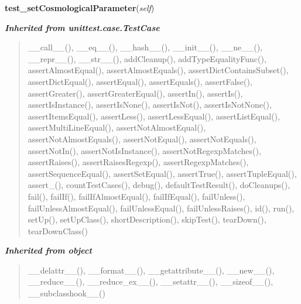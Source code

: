     \label{pycosmicstar:test_cosmology:test_lcdmcosmology:test_setCosmologicalParameter}

    \vspace{0.5ex}

\hspace{.8\funcindent}\begin{boxedminipage}{\funcwidth}

    \raggedright \textbf{test\_setCosmologicalParameter}(\textit{self})

\setlength{\parskip}{2ex}
\setlength{\parskip}{1ex}
    \end{boxedminipage}


\large{\textbf{\textit{Inherited from unittest.case.TestCase}}}

\begin{quote}
\_\_call\_\_(), \_\_eq\_\_(), \_\_hash\_\_(), \_\_init\_\_(), \_\_ne\_\_(), \_\_repr\_\_(), \_\_str\_\_(), addCleanup(), addTypeEqualityFunc(), assertAlmostEqual(), assertAlmostEquals(), assertDictContainsSubset(), assertDictEqual(), assertEqual(), assertEquals(), assertFalse(), assertGreater(), assertGreaterEqual(), assertIn(), assertIs(), assertIsInstance(), assertIsNone(), assertIsNot(), assertIsNotNone(), assertItemsEqual(), assertLess(), assertLessEqual(), assertListEqual(), assertMultiLineEqual(), assertNotAlmostEqual(), assertNotAlmostEquals(), assertNotEqual(), assertNotEquals(), assertNotIn(), assertNotIsInstance(), assertNotRegexpMatches(), assertRaises(), assertRaisesRegexp(), assertRegexpMatches(), assertSequenceEqual(), assertSetEqual(), assertTrue(), assertTupleEqual(), assert\_(), countTestCases(), debug(), defaultTestResult(), doCleanups(), fail(), failIf(), failIfAlmostEqual(), failIfEqual(), failUnless(), failUnlessAlmostEqual(), failUnlessEqual(), failUnlessRaises(), id(), run(), setUp(), setUpClass(), shortDescription(), skipTest(), tearDown(), tearDownClass()
\end{quote}

\large{\textbf{\textit{Inherited from object}}}

\begin{quote}
\_\_delattr\_\_(), \_\_format\_\_(), \_\_getattribute\_\_(), \_\_new\_\_(), \_\_reduce\_\_(), \_\_reduce\_ex\_\_(), \_\_setattr\_\_(), \_\_sizeof\_\_(), \_\_subclasshook\_\_()
\end{quote}


